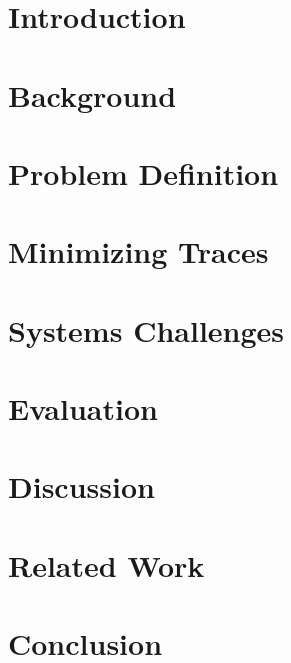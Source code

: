 \documentclass{sig-alternate-10pt}
\begin{document}
\section{Introduction}
\label{sec:intro}


\section{Background}
\label{sec:overview}


\section{Problem Definition}
\label{sec:formalism}


\section{Minimizing Traces}
\label{sec:approach}


\section{Systems Challenges}
\label{sec:architecture}
\label{sec:systems_challenges}


\section{Evaluation}
\label{sec:evaluation}


\section{Discussion}
\label{sec:discussion}


\section{Related Work}
\label{sec:related_work}


\section{Conclusion}
\label{sec:conclusion}



\renewcommand{\baselinestretch}{0.95}
\footnotesize{}

%

\end{document}
